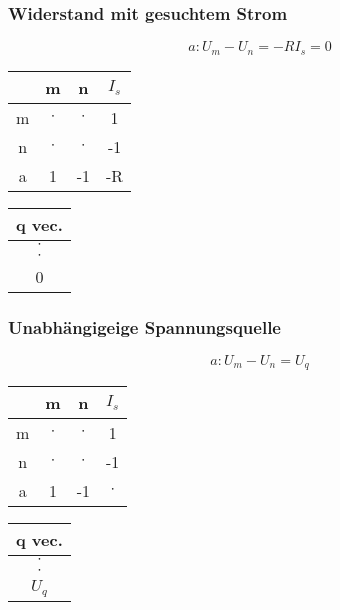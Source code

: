\begin{multicols*}{2}
    \subsubsection{Widerstand mit gesuchtem Strom}

    \begin{center}

        

        \[a: U_m - U_n = -R  I_s = 0\]

        \begin{tabular}{c|c|c|c}
            & m & n & $I_s$\\\hline
            m & $\cdot$ & $\cdot$ & 1 \\\hline
            n & $\cdot$ & $\cdot$ & -1\\\hline
            a & 1 & -1 & -R
        \end{tabular}
        \begin{tabular}{|c|}
            q vec.\\\hline
            $\cdot$\\\hline
            $\cdot$\\\hline
            0
        \end{tabular}
    \end{center}

    \subsubsection{Unabhängigeige Spannungsquelle}

    \begin{center}

        

        \[a: U_m - U_n = U_q \]

        \begin{tabular}{c|c|c|c}
            & m & n & $I_s$\\\hline
            m & $\cdot$ & $\cdot$ & 1 \\\hline
            n & $\cdot$ & $\cdot$ & -1\\\hline
            a & 1 & -1 & $\cdot$
        \end{tabular}
        \begin{tabular}{|c|}
            q vec.\\\hline
            $\cdot$\\\hline
            $\cdot$\\\hline
            $U_q$
        \end{tabular}
    \end{center}
    \newcolumn


\end{multicols*}
